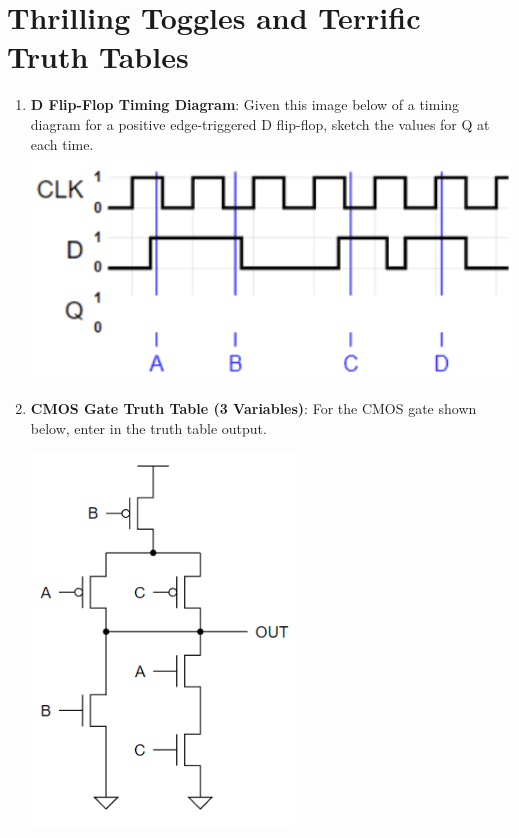 \documentclass{article}
\begin{document}
\section{Thrilling Toggles and Terrific Truth Tables}
\begin{enumerate}[label=(\alph*)]
    \item
        \textbf{D Flip-Flop Timing Diagram}: Given this image below of a timing diagram for a positive edge-triggered D flip-flop, sketch the values for Q at each time.
        \newline
        \includegraphics[width=15cm,height=6cm]{figures/DFlipFlop.png}
    \item 
        \textbf{CMOS Gate Truth Table (3 Variables)}: For the CMOS gate shown below, enter in the truth table output.
        \begin{multicols}{2}
        \includegraphics[width=7cm]{figures/CMOS.png}
        \columnbreak
        \begin{center}
        \scalebox{1.8} {
        \begin{tabular}{||c c c c||}

\end{tabular}}
\end{center}
\end{multicols}
\end{enumerate}
\end{document}
